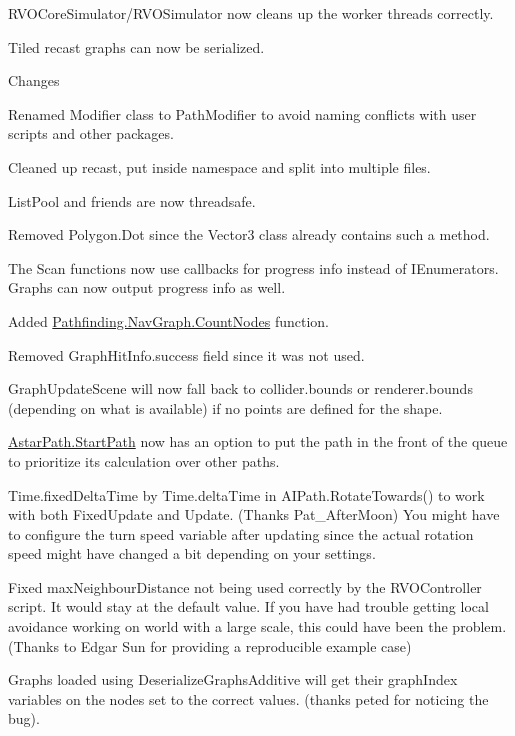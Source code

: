 \begin{DoxyItemize}
\begin{DoxyItemize}
\begin{DoxyItemize}
\item R\+V\+O\+Core\+Simulator/\+R\+V\+O\+Simulator now cleans up the worker threads correctly.
\item Tiled recast graphs can now be serialized.
\end{DoxyItemize}
\item Changes
\begin{DoxyItemize}
\item Renamed Modifier class to Path\+Modifier to avoid naming conflicts with user scripts and other packages.
\item Cleaned up recast, put inside namespace and split into multiple files.
\item List\+Pool and friends are now threadsafe.
\item Removed Polygon.\+Dot since the Vector3 class already contains such a method.
\item The Scan functions now use callbacks for progress info instead of I\+Enumerators. Graphs can now output progress info as well.
\item Added \mbox{\hyperlink{class_pathfinding_1_1_nav_graph_a8a16a2a7653e1420cf4863371782b7e9}{Pathfinding.\+Nav\+Graph.\+Count\+Nodes}} function.
\item Removed Graph\+Hit\+Info.\+success field since it was not used.
\item Graph\+Update\+Scene will now fall back to collider.\+bounds or renderer.\+bounds (depending on what is available) if no points are defined for the shape.
\item \mbox{\hyperlink{class_astar_path_aff2addb8d4dcda803cbdcffbdd94c833}{Astar\+Path.\+Start\+Path}} now has an option to put the path in the front of the queue to prioritize its calculation over other paths.
\item Time.\+fixed\+Delta\+Time by Time.\+delta\+Time in A\+I\+Path.\+Rotate\+Towards() to work with both Fixed\+Update and Update. (Thanks Pat\+\_\+\+After\+Moon) You might have to configure the turn speed variable after updating since the actual rotation speed might have changed a bit depending on your settings.
\item Fixed max\+Neighbour\+Distance not being used correctly by the R\+V\+O\+Controller script. It would stay at the default value. If you have had trouble getting local avoidance working on world with a large scale, this could have been the problem. (Thanks to Edgar Sun for providing a reproducible example case)
\item Graphs loaded using Deserialize\+Graphs\+Additive will get their graph\+Index variables on the nodes set to the correct values. (thanks peted for noticing the bug).

\end{DoxyItemize}
\end{DoxyItemize}
\end{DoxyItemize}
